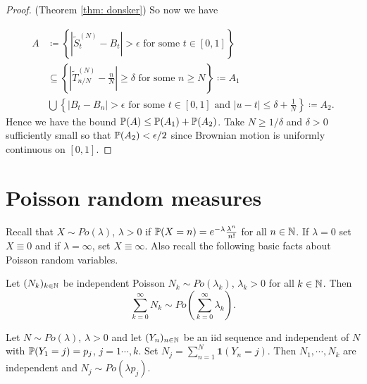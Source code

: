 \documentclass{article}
\begin{document}
\begin{proof}{(Theorem \ref{thm: donsker})}
    So now we have

\[
\begin{array}{ll}
	A&\coloneqq \left\{ |\tilde{S}^{(N)}_{t}-B_{t}|>\epsilon \text{ for some }t\in[0,1] \right\}   \\
	 &\subseteq \left\{ |\tilde{T}^{(N)}_{n/N}-\frac{n}{N}|\geq \delta \text{ for some } n\geq N \right\}\coloneqq A_{1}\\  &
	 \bigcup \left\{ |B_{t}-B_{n}|>\epsilon \text{ for some }t\in[0,1] \text{ and } |u-t|\leq \delta +\frac{1}{N} \right\}\coloneqq A_{2}.
\end{array}
\]
Hence we have the bound $ \mathbb{P}(A)\leq \mathbb{P}(A_{1})+\mathbb{P}(A_{2})$. Take $ N \geq 1/\delta$ and $ \delta>0$ sufficiently small so that $ \mathbb{P}(A_{2})<\epsilon/2$ since Brownian motion is uniformly continuous on $ [0,1]$.
\end{proof}

\section{Poisson random measures}\label{sec: poisson random measures}
Recall that $ X\sim Po(\lambda)$, $ \lambda >0$ if $ \mathbb{P}(X=n) = e^{-\lambda}\frac{\lambda^{n}}{n!}$ for all $ n\in \mathbb{N}$. If $ \lambda =0$ set $ X\equiv 0$ and if $ \lambda =\infty$, set $ X\equiv \infty$. Also recall the following basic facts about Poisson random variables. 

\begin{boxprop}\label{prop: prm addition}
Let $ (N_{k})_{k\in \mathbb{N}}$ be independent Poisson $ N_{k}\sim Po(\lambda_{k})$, $ \lambda_{k}>0$ for all $ k\in \mathbb{N}$. Then 
\[
\displaystyle\sum^{\infty}_{k=0}N_{k}\sim Po \left( \displaystyle\sum^{\infty}_{k=0}\lambda_{k}  \right). 
\]
\end{boxprop}

\begin{boxprop}\label{prop: prm splitting property}
Let $N\sim Po(\lambda)$, $ \lambda >0$ and let $ (Y_{n})_{n\in \mathbb{N}}$ be an iid sequence and independent of $ N$ with $ \mathbb{P}(Y_{1}=j)=p_{j}$, $ j=1\cdots, k$. Set $ N_{j}=\displaystyle\sum^{N}_{n=1} \mathbf{1}(Y_{n}=j) $. Then $ N_{1}, \cdots, N_{k}$ are independent and $ N_{j}\sim Po(\lambda p_{j})$. 
\end{boxprop}
\end{document}
